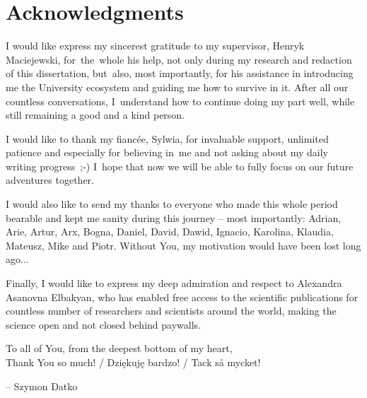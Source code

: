 
\chapter*{Acknowledgments}
\label{chapter:acknowledgments}

I would like express my sincerest gratitude to my supervisor, Henryk Maciejewski, for~the~whole his help, not only during my research and redaction of this dissertation, but~also, most importantly, for his assistance in introducing me the University ecosystem and guiding me how to survive in it. After all our countless conversations, I~understand how to continue doing my part well, while still remaining a good and a kind person.

I would like to thank my fiancée, Sylwia, for invaluable support, unlimited patience and especially for believing in~me and not asking about my daily writing progress~;-) I~hope that now we will be able to fully focus on our future adventures together.

I would also like to send my thanks to everyone who made this whole period bearable and kept me sanity during this journey – most importantly: Adrian, Arie, Artur, Arx, Bogna, Daniel, David, Dawid, Ignacio, Karolina, Klaudia, Mateusz, Mike and Piotr. Without You, my motivation would have been lost long ago...

Finally, I would like to express my deep admiration and respect to Alexandra Asanovna Elbakyan, who has enabled free access to the scientific publications for countless number of researchers and scientists around the world, making the science open and not closed behind paywalls.

\noindent
To all of You, from the deepest bottom of my heart, \\
Thank You so much! / Dziękuję bardzo! / Tack så mycket!

\hfill – Szymon Datko
